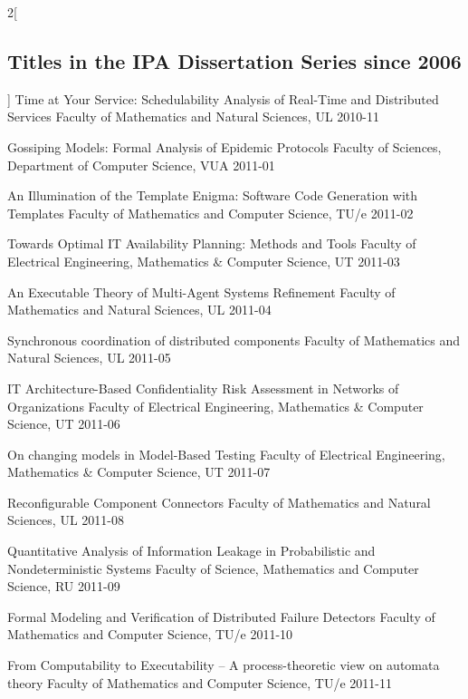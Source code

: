 \begin{multicols}{2}[\subsection*{Titles in the IPA Dissertation Series since 2006}]
         {Time at Your Service: Schedulability Analysis of Real-Time and Distributed Services}
         {Faculty of Mathematics and Natural Sciences, UL}
         {2010-11}

         {Gossiping Models: Formal Analysis of Epidemic Protocols}
         {Faculty of Sciences, Department of Computer Science, VUA}
         {2011-01}

         {An Illumination of the Template Enigma: Software Code Generation with Templates}
         {Faculty of Mathematics and Computer Science, TU/e}
         {2011-02}

         {Towards Optimal IT Availability Planning: Methods and Tools}
         {Faculty of Electrical Engineering, Mathematics \& Computer Science, UT}
         {2011-03}

         {An Executable Theory of Multi-Agent Systems Refinement}
         {Faculty of Mathematics and Natural Sciences, UL}
         {2011-04}

         {Synchronous coordination of distributed components}
         {Faculty of Mathematics and Natural Sciences, UL}
         {2011-05}

         {IT Architecture-Based Confidentiality Risk Assessment in Networks of Organizations}
         {Faculty of Electrical Engineering, Mathematics \& Computer Science, UT}
         {2011-06}

         {On changing models in Model-Based Testing}
         {Faculty of Electrical Engineering, Mathematics \& Computer Science, UT}
         {2011-07}

         {Reconfigurable Component Connectors}
         {Faculty of Mathematics and Natural Sciences, UL}
         {2011-08}

         {Quantitative Analysis of Information Leakage in Probabilistic and Nondeterministic Systems}
         {Faculty of Science, Mathematics and Computer Science, RU}
         {2011-09}

         {Formal Modeling and Verification of Distributed Failure Detectors}
         {Faculty of Mathematics and Computer Science, TU/e}
         {2011-10}

         {From Computability to Executability -- A process-theoretic view on automata theory}
         {Faculty of Mathematics and Computer Science, TU/e}
         {2011-11}


\end{multicols}
